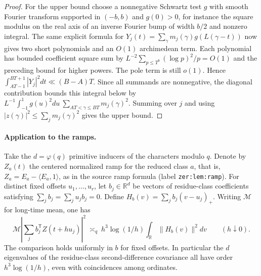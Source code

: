 \documentclass[11pt]{article}
\begin{document}
\begin{proof}
For the upper bound choose a nonnegative Schwartz test $g$ with smooth
Fourier transform supported in $(-b,b)$ and $g(0)>0$, for instance the
square modulus on the real axis of an inverse Fourier bump of width $b/2$
and nonzero integral. The same explicit formula for
$Y_j(t)=\sum_\gamma m_j(\gamma)g(L(\gamma-t))$ now gives two
short polynomials and an $O(1)$ archimedean term. Each polynomial has
bounded coefficient square sum by
$L^{-2}\sum_{p\le T^b}(\log p)^2/p=O(1)$ and the preceding bound for
higher powers. The pole term is still $o(1)$. Hence
$\int_{AT-1}^{BT+1}|Y_j|^2dt\ll (B-A)T$.
Since all summands are nonnegative, the diagonal contribution bounds
this integral below by
$L^{-1}\int_{-1}^1g(u)^2du\ \sum_{AT<\gamma\le BT}m_j(\gamma)^2$.
Summing over $j$ and using
$|z(\gamma)|^2\le\sum_jm_j(\gamma)^2$ gives the upper bound.
\end{proof}

\paragraph{Application to the ramps.}
Take the $d=\varphi(q)$ primitive inducers of the characters modulo $q$.
Denote by $Z_a(t)$ the centered normalized ramp for the reduced class
$a$, that is, $Z_a=E_a-\langle E_a,1\rangle$, as in the source ramp formula (label
\texttt{zer:lem:ramp}). For distinct fixed offsets $u_1,\ldots,u_r$,
let $b_j\in\mathbb R^d$ be vectors of residue-class coefficients satisfying
$\sum_jb_j=\sum_j u_jb_j=0$. Define
$H_b(v)=\sum_j b_j(v-u_j)_+$. Writing $\mathcal M$ for long-time mean, one has
\[
 \mathcal M\left|\sum_j b_j^{\mathsf T} Z(t+h u_j)\right|^2
 \ \asymp_{q}\ h^3\log(1/h)\int_{\mathbb R}\|H_b(v)\|^2dv
 \qquad (h\downarrow0).
\]
The comparison holds uniformly in $b$ for fixed offsets. In particular
the $d$ eigenvalues of the residue-class second-difference covariance all
have order $h^3\log(1/h)$, even with coincidences among ordinates.
\end{document}
